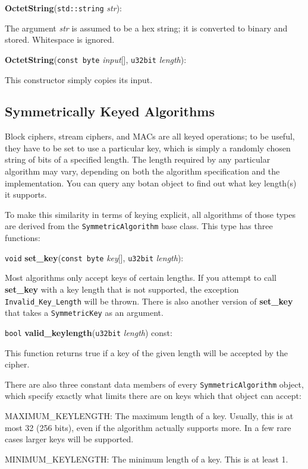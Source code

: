 \documentclass{article}
\newcommand{\function}[1]{\textbf{#1}}
\newcommand{\type}[1]{\texttt{#1}}
\renewcommand{\arg}[1]{\textsl{#1}}
\begin{document}
\noindent
\function{OctetString}(\type{std::string} \arg{str}):

The argument \arg{str} is assumed to be a hex string; it is converted to binary
and stored. Whitespace is ignored.

\noindent
\function{OctetString}(\type{const byte} \arg{input}[], \type{u32bit}
\arg{length}):

This constructor simply copies its input.

\subsection{Symmetrically Keyed Algorithms}

Block ciphers, stream ciphers, and MACs are all keyed operations; to
be useful, they have to be set to use a particular key, which is
simply a randomly chosen string of bits of a specified length.  The
length required by any particular algorithm may vary, depending on
both the algorithm specification and the implementation. You can query
any botan object to find out what key length(s) it supports.

To make this similarity in terms of keying explicit, all algorithms of
those types are derived from the \type{SymmetricAlgorithm} base
class. This type has three functions:

\noindent
\type{void} \function{set\_key}(\type{const byte} \arg{key}[], \type{u32bit}
\arg{length}):

Most algorithms only accept keys of certain lengths. If you attempt to call
\function{set\_key} with a key length that is not supported, the exception
\type{Invalid\_Key\_Length} will be thrown. There is also another version of
\function{set\_key} that takes a \type{SymmetricKey} as an argument.

\noindent
\type{bool} \function{valid\_keylength}(\type{u32bit} \arg{length}) const:

This function returns true if a key of the given length will be accepted by
the cipher.

There are also three constant data members of every \type{SymmetricAlgorithm}
object, which specify exactly what limits there are on keys which that object
can accept:

MAXIMUM\_KEYLENGTH: The maximum length of a key. Usually, this is at most 32
(256 bits), even if the algorithm actually supports more. In a few rare cases
larger keys will be supported.

MINIMUM\_KEYLENGTH: The minimum length of a key. This is at least 1.
\end{document}
